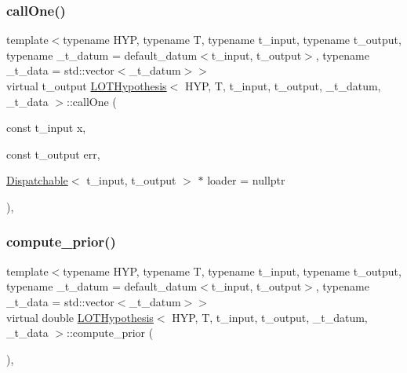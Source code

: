 \mbox{\label{class_l_o_t_hypothesis_ad792b258bdb4b0828f11ac721f52e704}} 
\subsubsection{\texorpdfstring{call\+One()}{callOne()}}
{\footnotesize\ttfamily template$<$typename H\+YP, typename T, typename t\+\_\+input, typename t\+\_\+output, typename \+\_\+t\+\_\+datum = default\+\_\+datum$<$t\+\_\+input, t\+\_\+output$>$, typename \+\_\+t\+\_\+data = std\+::vector$<$\+\_\+t\+\_\+datum$>$$>$ \\
virtual t\+\_\+output \hyperlink{class_l_o_t_hypothesis}{L\+O\+T\+Hypothesis}$<$ H\+YP, T, t\+\_\+input, t\+\_\+output, \+\_\+t\+\_\+datum, \+\_\+t\+\_\+data $>$\+::call\+One (\begin{DoxyParamCaption}\item[{const t\+\_\+input}]{x,  }\item[{const t\+\_\+output}]{err,  }\item[{\hyperlink{class_dispatchable}{Dispatchable}$<$ t\+\_\+input, t\+\_\+output $>$ $\ast$}]{loader = {\ttfamily nullptr} }\end{DoxyParamCaption})\hspace{0.3cm}{\ttfamily [inline]}, {\ttfamily [virtual]}}

\mbox{\label{class_l_o_t_hypothesis_ae0ea0b1cd5f7a89ef86f440276f04c4e}} 
\subsubsection{\texorpdfstring{compute\+\_\+prior()}{compute\_prior()}}
{\footnotesize\ttfamily template$<$typename H\+YP, typename T, typename t\+\_\+input, typename t\+\_\+output, typename \+\_\+t\+\_\+datum = default\+\_\+datum$<$t\+\_\+input, t\+\_\+output$>$, typename \+\_\+t\+\_\+data = std\+::vector$<$\+\_\+t\+\_\+datum$>$$>$ \\
virtual double \hyperlink{class_l_o_t_hypothesis}{L\+O\+T\+Hypothesis}$<$ H\+YP, T, t\+\_\+input, t\+\_\+output, \+\_\+t\+\_\+datum, \+\_\+t\+\_\+data $>$\+::compute\+\_\+prior (\begin{DoxyParamCaption}{ }\end{DoxyParamCaption})\hspace{0.3cm}{\ttfamily [inline]}, {\ttfamily [virtual]}}



